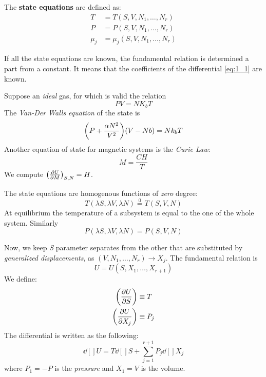 \documentclass[../main/main.tex]{subfiles}
\begin{document}
 The \textbf{state equations} are defined as:
\begin{subequations}
\begin{align}
  T &= T (S,V,N_1,\dots,N_r) \\
  P &= P (S,V,N_1,\dots,N_r) \\
  \mu _j &= \mu _j (S,V,N_1,\dots,N_r)
\end{align}
\label{}
\end{subequations}
\begin{remark}
If all the state equations are known, the fundamental relation is determined a part from a constant. It means that the coefficients of the differential \eqref{eq:1_1} are known.
\end{remark}
\begin{example}{}{}
Suppose an \emph{ideal} gas, for which is valid the relation
\begin{equation}
  P V = N K_b T
\end{equation}
The \emph{Van-Der Walls equation} of the state is
\begin{equation}
  \qty(P+\frac{\alpha N^2}{V^2})\qty(V-Nb) = N k_b T
\end{equation}
Another equation of state for magnetic systems is the \emph{Curie Law}:
\begin{equation}
M=\frac{C H}{T}
\end{equation}
We compute \( \qty(\pdv{U}{M} )_{S,N}=H  \).
\end{example}

The state equations are homogenous functions of \emph{zero} degree:
\begin{equation}
  T (\lambda S, \lambda V, \lambda N) \overset{0}{=} T (S,V,N)
  \label{eq:}
\end{equation}
At equilibrium the temperature of a subsystem is equal to the one of the whole system.
Similarly
\begin{equation}
  P (\lambda S, \lambda V, \lambda N) = P (S,V,N)
  \label{eq:}
\end{equation}

Now, we keep \emph{S} parameter separates from the other that are substituted by \emph{generalized displacements}, as \( (V,N_1,\dots,N_r) \rightarrow X_j \). The fundamental relation is
\begin{equation}
  U=U(S,X_1,\dots,X_{r+1})
\end{equation}
 We define:
\begin{subequations}
\begin{align}
  \qty(\pdv{U}{S}) & \equiv   T  \\
  \qty(\pdv{U}{X_j}) & \equiv  P_j
\end{align}
\end{subequations}
The differential is written as the following:
\begin{equation}
  \dd[]{U} = T \dd[]{S} + \sum_{j=1}^{r+1} P_j \dd[]{X_j}
  \label{eq:}
\end{equation}
where \( P_1 = -P \) is the \emph{pressure} and \( X_1 = V \) is the volume.
\end{document}
